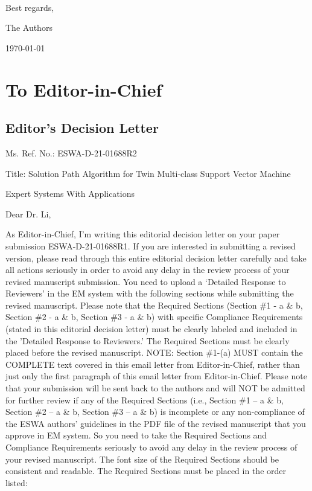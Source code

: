 \documentclass[12pt, review]{elsarticle}
\def\mycoauthor{The Authors}
\def\mydate{\today} %
\begin{document}
~\\
\noindent Best regards,

\noindent \mycoauthor

\noindent \mydate


\tableofcontents
\newpage

\section{To Editor-in-Chief}


\subsection{Editor’s Decision Letter}

Ms. Ref. No.: ESWA-D-21-01688R2

Title: Solution Path Algorithm for Twin Multi-class Support Vector Machine

Expert Systems With Applications

Dear Dr. Li, 

As Editor-in-Chief, I’m writing this editorial decision letter on your paper submission ESWA-D-21-01688R1.  If you are interested in submitting a revised version, please read through this entire editorial decision letter carefully and take all actions seriously in order to avoid any delay in the review process of your revised manuscript submission.  You need to upload a ‘Detailed Response to Reviewers’ in the EM system with the following sections while submitting the revised manuscript. Please note that the Required Sections (Section \#1 - a \& b, Section \#2 - a \& b, Section \#3 - a \& b) with specific Compliance Requirements (stated in this editorial decision letter) must be clearly labeled and included in the 'Detailed Response to Reviewers.’  The Required Sections must be clearly placed before the revised manuscript. NOTE: Section \#1-(a) MUST contain the COMPLETE text covered in this email letter from Editor-in-Chief, rather than just only the first paragraph of this email letter from Editor-in-Chief. Please note that your
submission will be sent back to the authors and will NOT be admitted for further review if any of the Required Sections (i.e., Section \#1 – a \& b, Section \#2 – a \& b, Section \#3 – a \& b) is incomplete or any non-compliance of the ESWA authors’ guidelines in the PDF file of the revised manuscript that you approve in EM system.  So you need to take the Required Sections and Compliance Requirements seriously to avoid any delay in the review process of your revised manuscript.  The font size of the Required Sections should be consistent and readable. The Required Sections must be placed in the order listed: 
\end{document}
